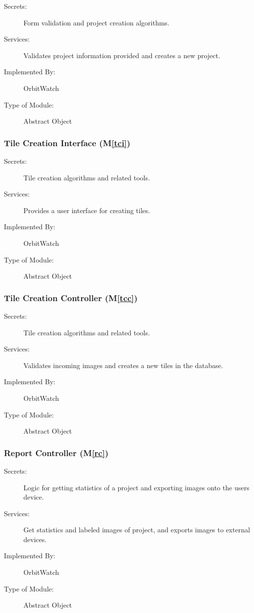 \documentclass[12pt, titlepage]{article}
\newcommand{\mref}[1]{M\ref{#1}}
\begin{document}
\begin{description}
\item[Secrets:] Form validation and project creation algorithms.
\item[Services:] Validates project information provided and creates a new project.
\item[Implemented By:] OrbitWatch
\item[Type of Module:] Abstract Object
\end{description}

\subsubsection{Tile Creation Interface (\mref{tci})}

\begin{description}
\item[Secrets:] Tile creation algorithms and related tools.
\item[Services:] Provides a user interface for creating tiles.
\item[Implemented By:] OrbitWatch
\item[Type of Module:] Abstract Object
\end{description}

\subsubsection{Tile Creation Controller (\mref{tcc})}

\begin{description}
\item[Secrets:] Tile creation algorithms and related tools.
\item[Services:] Validates incoming images and creates a new tiles in the database.
\item[Implemented By:] OrbitWatch
\item[Type of Module:] Abstract Object
\end{description}

\subsubsection{Report Controller (\mref{rc})}

\begin{description}
\item[Secrets:] Logic for getting statistics of a project and exporting images onto the users device.
\item[Services:] Get statistics and labeled images of project, and exports images to external devices.
\item[Implemented By:] OrbitWatch
\item[Type of Module:] Abstract Object
\end{description}
\end{document}
